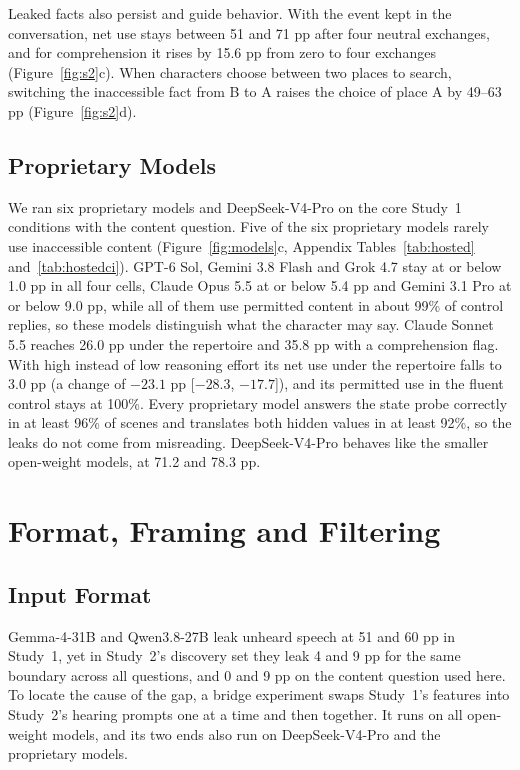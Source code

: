 Leaked facts also persist and guide behavior. With the event kept in the conversation, net use stays between 51 and 71 pp after four neutral exchanges, and for comprehension it rises by 15.6 pp from zero to four exchanges (Figure~\ref{fig:s2}c). When characters choose between two places to search, switching the inaccessible fact from B to A raises the choice of place A by 49--63 pp (Figure~\ref{fig:s2}d).

\subsection{Proprietary Models}
\label{sec:proprietary}
We ran six proprietary models and DeepSeek-V4-Pro on the core Study~1 conditions with the content question. Five of the six proprietary models rarely use inaccessible content (Figure~\ref{fig:models}c, Appendix Tables~\ref{tab:hosted} and~\ref{tab:hostedci}). GPT-6 Sol, Gemini 3.8 Flash and Grok 4.7 stay at or below 1.0 pp in all four cells, Claude Opus 5.5 at or below 5.4 pp and Gemini 3.1 Pro at or below 9.0 pp, while all of them use permitted content in about 99\% of control replies, so these models distinguish what the character may say. Claude Sonnet 5.5 reaches 26.0 pp under the repertoire and 35.8 pp with a comprehension flag. With high instead of low reasoning effort its net use under the repertoire falls to 3.0 pp (a change of $-23.1$ pp [$-28.3$, $-17.7$]), and its permitted use in the fluent control stays at 100\%. Every proprietary model answers the state probe correctly in at least 96\% of scenes and translates both hidden values in at least 92\%, so the leaks do not come from misreading. DeepSeek-V4-Pro behaves like the smaller open-weight models, at 71.2 and 78.3 pp.


\section{Format, Framing and Filtering}
\label{sec:format}
\subsection{Input Format}
\label{sec:frontier}
Gemma-4-31B and Qwen3.8-27B leak unheard speech at 51 and 60 pp in Study~1, yet in Study~2's discovery set they leak 4 and 9 pp for the same boundary across all questions, and 0 and 9 pp on the content question used here. To locate the cause of the gap, a bridge experiment swaps Study~1's features into Study~2's hearing prompts one at a time and then together. It runs on all open-weight models, and its two ends also run on DeepSeek-V4-Pro and the proprietary models.

